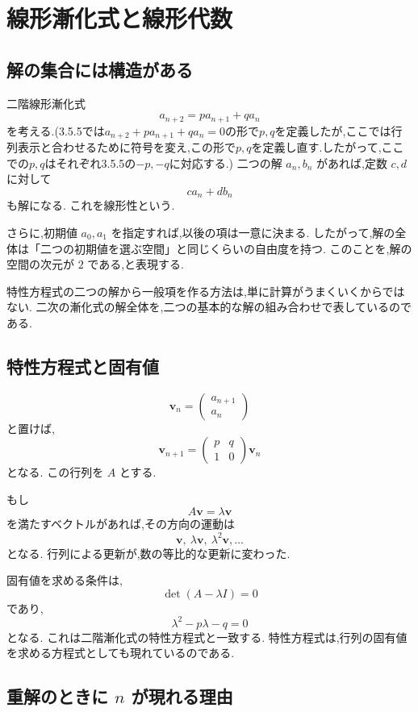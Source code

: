 
\section{線形漸化式と線形代数}

\subsection{解の集合には構造がある}

二階線形漸化式
\[
  a_{n+2}=pa_{n+1}+qa_n
\]
を考える.(3.5.5では$a_{n+2}+pa_{n+1}+qa_n=0$の形で$p,q$を定義したが,ここでは行列表示と合わせるために符号を変え,この形で$p,q$を定義し直す.したがって,ここでの$p,q$はそれぞれ3.5.5の$-p,-q$に対応する.)
二つの解 $a_n,b_n$ があれば,定数 $c,d$ に対して
\[
  c a_n+d b_n
\]
も解になる.
これを線形性という.

さらに,初期値 $a_0,a_1$ を指定すれば,以後の項は一意に決まる.
したがって,解の全体は「二つの初期値を選ぶ空間」と同じくらいの自由度を持つ.
このことを,解の空間の次元が $2$ である,と表現する.

特性方程式の二つの解から一般項を作る方法は,単に計算がうまくいくからではない.
二次の漸化式の解全体を,二つの基本的な解の組み合わせで表しているのである.

\subsection{特性方程式と固有値}

\[
  \boldsymbol v_n=
  \begin{pmatrix}a_{n+1}\\a_n\end{pmatrix}
\]
と置けば,
\[
  \boldsymbol v_{n+1}
  =
  \begin{pmatrix}p&q\\1&0\end{pmatrix}
  \boldsymbol v_n
\]
となる.
この行列を $A$ とする.

もし
\[
  A\boldsymbol v=\lambda\boldsymbol v
\]
を満たすベクトルがあれば,その方向の運動は
\[
  \boldsymbol v,\ \lambda\boldsymbol v,\ \lambda^2\boldsymbol v,\ldots
\]
となる.
行列による更新が,数の等比的な更新に変わった.

固有値を求める条件は,
\[
  \det(A-\lambda I)=0
\]
であり,
\[
  \lambda^2-p\lambda-q=0
\]
となる.
これは二階漸化式の特性方程式と一致する.
特性方程式は,行列の固有値を求める方程式としても現れているのである.

\subsection{重解のときに $n$ が現れる理由}

